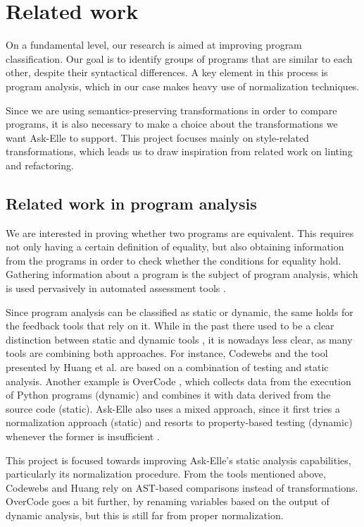 \chapter{Related work}
\label{sec:related-work}

On a fundamental level, our research is aimed at improving program classification. Our goal is to identify groups of programs that are similar to each other, despite their syntactical differences. A key element in this process is program analysis, which in our case makes heavy use of normalization techniques.

Since we are using semantics-preserving transformations in order to compare programs, it is also necessary to make a choice about the transformations we want Ask-Elle to support. This project focuses mainly on style-related transformations, which leads us to draw inspiration from related work on linting and refactoring.

\section{Related work in program analysis}

We are interested in proving whether two programs are equivalent. This requires not only having a certain definition of equality, but also obtaining information from the programs in order to check whether the conditions for equality hold. Gathering information about a program is the subject of program analysis, which is used pervasively in automated assessment tools  \cite{2005alasurvey}.

Since program analysis can be classified as static or dynamic, the same holds for the feedback tools that rely on it. While in the past there used to be a clear distinction between static and dynamic tools \cite{2016feedbackreview}, it is nowadays less clear, as many tools are combining both approaches. For instance, Codewebs \cite{2014codewebs} and the tool presented by Huang et al. \cite{2013huang} are based on a combination of testing and static analysis. Another example is OverCode \cite{2015overcode}, which collects data from the execution of Python programs (dynamic) and combines it with data derived from the source code (static). Ask-Elle also uses a mixed approach, since it first tries a normalization approach (static) and resorts to property-based testing (dynamic) whenever the former is insufficient \cite{2017askelle}.

This project is focused towards improving Ask-Elle's static analysis capabilities, particularly its normalization procedure. From the tools mentioned above, Codewebs and Huang rely on AST-based comparisons instead of transformations. OverCode goes a bit further, by renaming variables based on the output of dynamic analysis, but this is still far from proper normalization.

